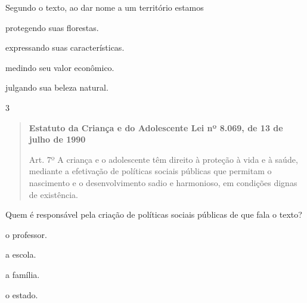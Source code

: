Segundo o texto, ao dar nome a um território estamos

\begin{escolha}
\item protegendo suas florestas.

\item expressando suas características.

\item medindo seu valor econômico.

\item julgando sua beleza natural.
\end{escolha}


\num{3}

\begin{quote}
\textbf{Estatuto da Criança e do Adolescente Lei nº 8.069, de 13 de julho de 1990}

Art. 7º A criança e o adolescente têm direito à proteção à vida e à
saúde, mediante a efetivação de políticas sociais públicas que permitam
o nascimento e o desenvolvimento sadio e harmonioso, em condições dignas
de existência.
\end{quote}

Quem é responsável pela criação de políticas sociais públicas de que
fala o texto?

\begin{escolha}
\item o professor.

\item a escola.

\item a família.

\item o estado.
\end{escolha}

